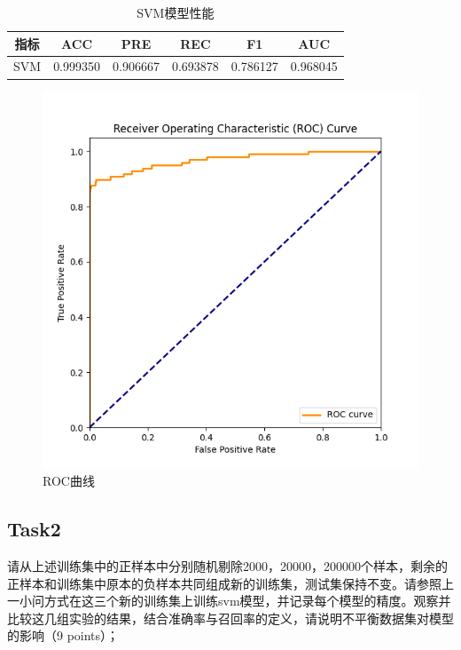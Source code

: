 \documentclass[8pt]{article}
\begin{document}
\begin{minipage}{\textwidth}
    \begin{minipage}{0.65\textwidth}
        \begin{table}[H]
            \caption{SVM模型性能}
            \raggedright
            \begin{tabular}{cccccc}
            \toprule
            指标 & ACC & PRE & REC & F1 & AUC \\
            \midrule
            SVM & 0.999350 & 0.906667 & 0.693878 & 0.786127 & 0.968045\\
            \bottomrule
            \end{tabular}
        \end{table}
    \end{minipage}
    \begin{minipage}{0.35\textwidth}
        \begin{figure}[H]
            \raggedright
            \includegraphics[width=\textwidth]{../Prob1/out/rand_seed_14/task1/roc_curve.png}
            \caption{ROC曲线}
        \end{figure}
    \end{minipage}
\end{minipage}
\subsection*{Task2}
请从上述训练集中的正样本中分别随机剔除2000，20000，200000个样本，剩余的正样本和训练集中原本的负样本共同组成新的训练集，测试集保持不变。请参照上一小问方式在这三个新的训练集上训练svm模型，并记录每个模型的精度。观察并比较这几组实验的结果，结合准确率与召回率的定义，请说明不平衡数据集对模型的影响（9 points）；
\end{document}
